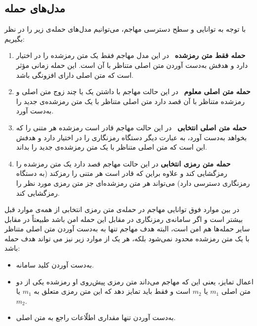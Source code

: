 \subsection*{مدل‌های حمله}
با توجه  به توانایی و سطح دسترسی مهاجم، می‌توانیم مدل‌های حمله‌ی زیر را در نظر بگیریم:
\begin{enumerate}
	\item
	\textbf{حمله‌  فقط متن رمزشده}
	 \ در این مدل مهاجم فقط یک متن رمز‌شده را در اختیار دارد و هدفش به‌دست  آوردن متن اصلی متناظر با آن است. این حمله زمانی مؤثر  است که متن اصلی دارای افزونگی 
	 باشد.
	 \item
	 \textbf{حمله‌  متن اصلی معلوم}
	  \ در این حالت مهاجم با داشتن یک یا چند زوج متن اصلی و رمزشده‌‌  متناظر با آن قصد دارد متن اصلی متناظر با یک متن رمزشده‌ی جدید را به‌دست  آورد.
	  \item
	  \textbf{حمله‌  متن اصلی انتخابی}
	\ در این حالت مهاجم قادر است رمز‌شده‌  هر متنی را که بخواهد به‌دست  آورد،  به عبارت دیگر دستگاه رمزنگاری را در اختیار دارد و هدفش این است که متن اصلی متناظر با یک متن رمز‌شده‌ی جدید را بداند.
	  
\item
\textbf{حمله‌  متن رمزی انتخابی}
در این حالت مهاجم قصد دارد یک متن رمزشده را رمزگشایی کند و علاوه بر‌این که قادر است هر متنی را رمزکند (به دستگاه رمزنگاری دسترسی دارد) می‌تواند هر متن رمزشده‌ای جز متن رمزی مورد نظر را رمزگشایی کند. 
	 
\end{enumerate}

در بین موارد فوق توانایی مهاجم در حمله‌ی متن رمزی انتخابی از همه‌ی موارد قبل بیشتر است و اگر سامانه‌ی رمزنگاری در مقابل این حمله امن باشد طبیعتاً در مقابل سایر حمله‌ها هم امن است، البته هدف مهاجم تنها به به‌دست  آوردن متن اصلی متناظر با یک متن‌ رمز‌شده محدود نمی‌شود بلکه، هر یک از موارد زیر نیز می تواند هدف حمله باشد:
\begin{itemize}
\item
به‌دست  آوردن کلید سامانه.
\item
اعمال تمایز، یعنی این که مهاجم می‌داند متن رمزی پیش‌روی او رمز‌شده یکی از دو متن اصلی 
$m_{1}$
یا 
$m_{2}$
است و فقط باید تمایز دهد که این متن رمزی متعلق به 
$m_{1}$
 یا 
 $m_{2}$.
\item
به‌دست  آوردن تنها مقداری اطلّاعات راجع به متن اصلی.
\end{itemize}


